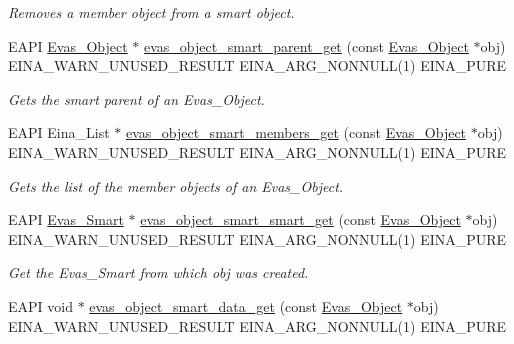 \begin{DoxyCompactItemize}
\begin{DoxyCompactList}\small\item\em Removes a member object from a smart object. \item\end{DoxyCompactList}\item 
EAPI \hyperlink{group__Evas__Object__Group_ga9e19e6dd1f517a0ba437c0114d3e7c97}{Evas\_\-Object} $\ast$ \hyperlink{group__Evas__Smart__Object__Group_gaee8228f86a2a896112b3dbfe09d83511}{evas\_\-object\_\-smart\_\-parent\_\-get} (const \hyperlink{group__Evas__Object__Group_ga9e19e6dd1f517a0ba437c0114d3e7c97}{Evas\_\-Object} $\ast$obj) EINA\_\-WARN\_\-UNUSED\_\-RESULT EINA\_\-ARG\_\-NONNULL(1) EINA\_\-PURE
\begin{DoxyCompactList}\small\item\em Gets the smart parent of an Evas\_\-Object. \item\end{DoxyCompactList}\item 
EAPI Eina\_\-List $\ast$ \hyperlink{Evas_8h_afa903e37a9f98f80f1d73996cf5354cc}{evas\_\-object\_\-smart\_\-members\_\-get} (const \hyperlink{group__Evas__Object__Group_ga9e19e6dd1f517a0ba437c0114d3e7c97}{Evas\_\-Object} $\ast$obj) EINA\_\-WARN\_\-UNUSED\_\-RESULT EINA\_\-ARG\_\-NONNULL(1) EINA\_\-PURE
\begin{DoxyCompactList}\small\item\em Gets the list of the member objects of an Evas\_\-Object. \item\end{DoxyCompactList}\item 
EAPI \hyperlink{Evas_8h_a7cdfd1afece1cad64c413eb9a778ddbb}{Evas\_\-Smart} $\ast$ \hyperlink{group__Evas__Smart__Object__Group_gab1423d63011d7f3679c95ea1638fa714}{evas\_\-object\_\-smart\_\-smart\_\-get} (const \hyperlink{group__Evas__Object__Group_ga9e19e6dd1f517a0ba437c0114d3e7c97}{Evas\_\-Object} $\ast$obj) EINA\_\-WARN\_\-UNUSED\_\-RESULT EINA\_\-ARG\_\-NONNULL(1) EINA\_\-PURE
\begin{DoxyCompactList}\small\item\em Get the Evas\_\-Smart from which {\ttfamily obj} was created. \item\end{DoxyCompactList}\item 
EAPI void $\ast$ \hyperlink{group__Evas__Smart__Object__Group_gad77ac4b3dcb2929ff7d02e76a26e272a}{evas\_\-object\_\-smart\_\-data\_\-get} (const \hyperlink{group__Evas__Object__Group_ga9e19e6dd1f517a0ba437c0114d3e7c97}{Evas\_\-Object} $\ast$obj) EINA\_\-WARN\_\-UNUSED\_\-RESULT EINA\_\-ARG\_\-NONNULL(1) EINA\_\-PURE

\end{DoxyCompactItemize}
